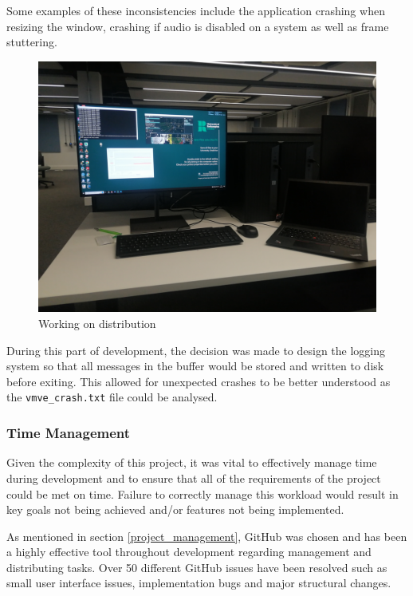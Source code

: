 \documentclass[11pt]{article}
\begin{document}
Some examples of these inconsistencies include the application crashing when
resizing the window, crashing if audio is disabled on a system as well as frame
stuttering.

\begin{figure}[H]
  \centering
  \includegraphics[width=\textwidth]{images/multiple_systems.png}
  \caption{Working on distribution}
  \label{fig:multiple_systems}
\end{figure}


During this part of development, the decision was made to design the logging
system so that all messages in the buffer would be stored and written to disk
before exiting. This allowed for unexpected crashes to be better understood as
the \lstinline{vmve_crash.txt} file could be analysed.

\subsubsection{Time Management}
Given the complexity of this project, it was vital to effectively manage time
during development and to ensure that all of the requirements of the project
could be met on time. Failure to correctly manage this workload would result in
key goals not being achieved and/or features not being implemented.

As mentioned in section \ref{project_management}, GitHub was chosen and has been
a highly effective tool throughout development regarding management and
distributing tasks. Over 50 different GitHub issues have been resolved such as
small user interface issues, implementation bugs and major structural changes.
\end{document}
